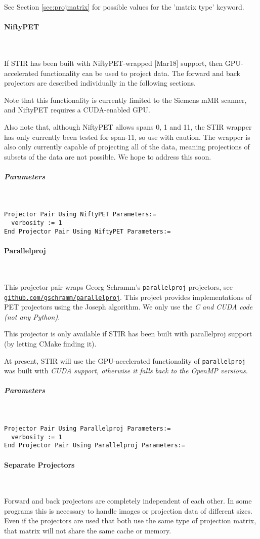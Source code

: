 \documentclass{article}
\def\url#1#2{\mbox{\href{#1}{\tt #2}}}
\newcommand{\subsubsubsection}[1]{\paragraph{#1}\mbox{} \\}
\newcommand{\subsubsubsubsection}[1]{\subparagraph{#1} \mbox{} \\}
\begin{document}
{{See Section \ref{sec:projmatrix} for possible values for the 'matrix type' keyword.

{ \subsubsubsection{NiftyPET}
}
\label{sec:projectorpairusingNiftyPET}
If STIR has been built with NiftyPET-wrapped [Mar18] support, then GPU-accelerated functionality can be used to project data. The forward and back projectors are described individually in the following sections.

Note that this functionality is currently limited to the Siemens mMR scanner, and NiftyPET requires a CUDA-enabled GPU.

Also note that, although NiftyPET allows spans 0, 1 and 11, the STIR wrapper has only currently been tested for span-11, so use with caution. The wrapper is also only currently capable of projecting all of the data, meaning projections of subsets of the data are not possible. We hope to address this soon.

{ \subsubsubsubsection{Parameters}
}
\begin{verbatim}
Projector Pair Using NiftyPET Parameters:=
  verbosity := 1
End Projector Pair Using NiftyPET Parameters:=
\end{verbatim}

{ \subsubsubsection{Parallelproj}
\label{sec:projectorpairusingparallelproj}
}
This projector pair wraps Georg Schramm's \texttt{parallelproj} projectors, see
\url{https://github.com/gschramm/parallelproj}{github.com/gschramm/parallelproj}. This project provides implementations
of PET projectors using the Joseph algorithm. We only use the \em{C} and \em{CUDA} code (not
any \em{Python}).

This projector is only available if STIR has been built with parallelproj support (by letting CMake finding it).

At present, STIR will use the GPU-accelerated functionality of \texttt{parallelproj} was
built with \em{CUDA} support, otherwise it falls back to the \em{OpenMP} versions.


{ \subsubsubsubsection{Parameters}
}
\begin{verbatim}
Projector Pair Using Parallelproj Parameters:=
  verbosity := 1
End Projector Pair Using Parallelproj Parameters:=
\end{verbatim}

{ \subsubsubsection{Separate Projectors }
}
Forward and back projectors are completely independent of each 
other. In some programs this is necessary to handle images or 
projection data of different sizes. \\
Even if the projectors are used that both use the same type of 
projection matrix, that matrix will not share the same cache 
or memory.

}}
\end{document}
